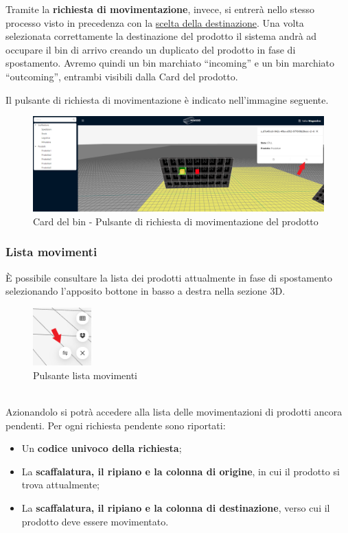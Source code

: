         \bigskip
        \noindent Tramite la \textbf{richiesta di movimentazione}, invece, si entrerà nello stesso processo visto in precedenza con la \hyperref[destinazione_prodotto]{scelta della destinazione}. Una volta selezionata correttamente la destinazione del prodotto il sistema andrà ad occupare il bin di arrivo creando un duplicato del prodotto in fase di spostamento. Avremo quindi un bin marchiato ``incoming'' e un bin marchiato ``outcoming'', entrambi visibili dalla Card del prodotto.
        
        \noindent Il pulsante di richiesta di movimentazione è indicato nell'immagine seguente.
        \begin{figure}[H]
                \centering
                \includegraphics[width=1.0\textwidth]{images/movimentazione.png}
                \caption{Card del bin - Pulsante di richiesta di movimentazione del prodotto}
        \end{figure}
        
    \subsubsection{Lista movimenti} \label{sec:movimento:lista}
        È possibile consultare la lista dei prodotti attualmente in fase di spostamento selezionando l'apposito bottone in basso a destra nella sezione 3D.
        \begin{figure}[h!]
            \centering
            \includegraphics[width=0.2\textwidth]{images/pulsante_lista.png}
            \caption{Pulsante lista movimenti}
        \end{figure}\\
        \noindent Azionandolo si potrà accedere alla lista delle movimentazioni di prodotti ancora pendenti.
        Per ogni richiesta pendente sono riportati:
        \begin{itemize}
            \item Un \textbf{codice univoco della richiesta};
            \item La \textbf{scaffalatura, il ripiano e la colonna di origine}, in cui il prodotto si trova attualmente;
            \item La \textbf{scaffalatura, il ripiano e la colonna di destinazione}, verso cui il prodotto deve essere movimentato.
        \end{itemize}
        
